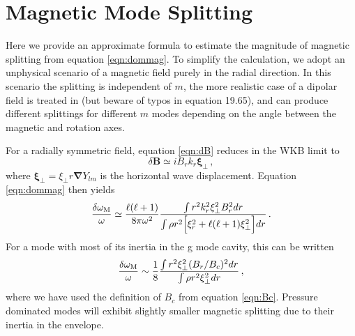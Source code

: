 




\section{Magnetic Mode Splitting}
\label{magmode}

Here we provide an approximate formula to estimate the magnitude of magnetic splitting from equation \ref{eqn:dommag}. To simplify the calculation, we adopt an unphysical scenario of a magnetic field purely in the radial direction. In this scenario the splitting is independent of $m$, the more realistic case of a dipolar field is treated in \cite{Unno_1989} (but beware of typos in equation 19.65), and can produce different splittings for different $m$ modes depending on the angle between the magnetic and rotation axes.

For a radially symmetric field, equation \ref{eqn:dB} reduces in the WKB limit to 
\begin{equation}
\delta {\boldsymbol B} \simeq i B_r k_r \boldsymbol{\xi}_\perp \, ,
\end{equation}
where $\boldsymbol{\xi}_\perp = \xi_\perp r \boldsymbol{\nabla} Y_{lm}$ is the horizontal wave displacement. Equation \ref{eqn:dommag} then yields
\begin{equation}
\label{eqn:dommag2}
\frac{\delta \omega_{\rm M}}{\omega} \simeq \frac{\ell(\ell+1)}{8 \pi \omega^2 } \frac{\int r^2 k_r^2 \xi_\perp^2 B_r^2 d r }{\int  \rho r^2 \Big[ \xi_r^2 + \ell(\ell+1) \xi_\perp^2 \Big] d r }\, .
\end{equation}
For a mode with most of its inertia in the g mode cavity, this can be written 
\begin{equation}
\label{eqn:dommag3}
\frac{\delta \omega_{\rm M}}{\omega} \sim \frac{1}{8} \frac{\int r^2 \xi_\perp^2 (B_r/B_c)^2 d r }{\int \rho r^2 \xi_\perp^2 d r }\, ,
\end{equation}
where we have used the definition of $B_c$ from equation \ref{eqn:Bc}. Pressure dominated modes will exhibit slightly smaller magnetic splitting due to their inertia in the envelope.

